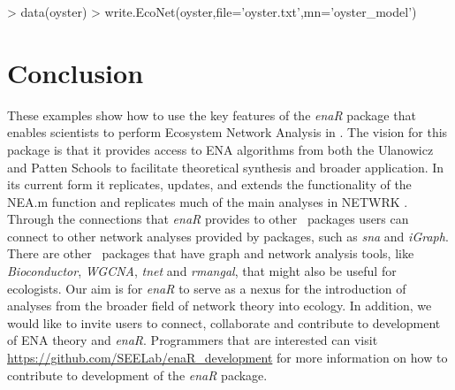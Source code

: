 \documentclass[article]{jss}
\newcommand{\R}{\proglang{R}}
\begin{document}
\begin{Schunk}
\begin{Sinput}
> data(oyster)
> write.EcoNet(oyster,file='oyster.txt',mn='oyster_model')
\end{Sinput}
\end{Schunk}


\section{Conclusion}

These examples show how to use the key features of the \textit{enaR}
package that enables scientists to perform Ecosystem Network Analysis
in \R.  The vision for this package is that it provides access to ENA
algorithms from both the Ulanowicz and Patten Schools to facilitate
theoretical synthesis and broader application.  In its current form it
replicates, updates, and extends the functionality of the NEA.m
function \citep{fath06} and replicates much of the main analyses in NETWRK
\citep{ulanowicz91}.  Through the connections that \textit{enaR}
provides to other \R\ packages users can connect to other network
analyses provided by packages, such as \textit{sna} and
\textit{iGraph}. There are other \R\ packages that have graph and
network analysis tools, like \textit{Bioconductor}, \textit{WGCNA},
\textit{tnet} and \textit{rmangal}, that might also be useful for
ecologists.  Our aim is for \textit{enaR} to serve as a nexus for the
introduction of analyses from the broader field of network theory into
ecology. In addition, we would like to invite users to connect,
collaborate and contribute to development of ENA theory and
\textit{enaR}. Programmers that are interested can visit
\url{https://github.com/SEELab/enaR_development} for more information
on how to contribute to development of the \textit{enaR} package.


\end{document}

